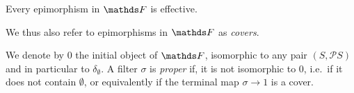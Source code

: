\begin{lem}\label{lem:epis-are-regular}
    Every epimorphism in $\FF$ is effective. 
\end{lem}

\begin{rmk}
    We thus also refer to epimorphisms in $\FF$ as \emph{covers}.
\end{rmk}

We denote by $0$ the initial object of $\FF$, isomorphic to any pair $(S, \mathcal P S)$ and in particular to $\delta_{\emptyset}$. A filter $\sigma$ is \emph{proper} if, it is not isomorphic to $0$, i.e.\ if it does not contain $\emptyset$, or equivalently if the terminal map $\sigma\to 1$ is a cover. 

